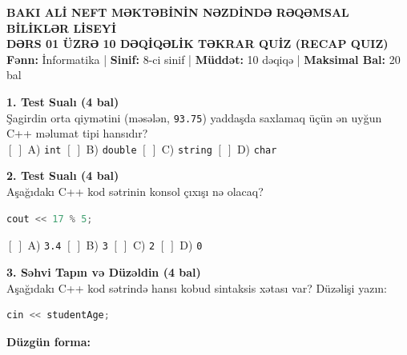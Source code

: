 \documentclass[10pt,a4paper]{article}
\begin{document}
\begin{center}
    {\large \textbf{BAKI ALİ NEFT MƏKTƏBİNİN NƏZDİNDƏ RƏQƏMSAL BİLİKLƏR LİSEYİ}}\\[0.1cm]
    {\Large \textbf{DƏRS 01 ÜZRƏ 10 DƏQİQƏLİK TƏKRAR QUİZ (RECAP QUIZ)}}\\[0.1cm]
    {\small \textbf{Fənn:} İnformatika \quad | \quad \textbf{Sinif:} 8-ci sinif \quad | \quad \textbf{Müddət:} 10 dəqiqə \quad | \quad \textbf{Maksimal Bal:} 20 bal}
\end{center}

\vspace{0.05cm}
\noindent{}

\vspace{0.25cm}

\textbf{1. Test Sualı (4 bal)}\\
Şagirdin orta qiymətini (məsələn, \texttt{93.75}) yaddaşda saxlamaq üçün ən uyğun C++ məlumat tipi hansıdır?\\
$[ \ ]$ A) \texttt{int} \hspace{2cm} $[ \ ]$ B) \texttt{double} \hspace{2cm} $[ \ ]$ C) \texttt{string} \hspace{2cm} $[ \ ]$ D) \texttt{char}

\vspace{0.35cm}
\textbf{2. Test Sualı (4 bal)}\\
Aşağıdakı C++ kod sətrinin konsol çıxışı nə olacaq?
\begin{lstlisting}[language=C++]
cout << 17 % 5;
\end{lstlisting}
$[ \ ]$ A) \texttt{3.4} \hspace{2cm} $[ \ ]$ B) \texttt{3} \hspace{2cm} $[ \ ]$ C) \texttt{2} \hspace{2cm} $[ \ ]$ D) \texttt{0}

\vspace{0.35cm}
\textbf{3. Səhvi Tapın və Düzəldin (4 bal)}\\
Aşağıdakı C++ kod sətrində hansı kobud sintaksis xətası var? Düzəlişi yazın:
\begin{lstlisting}[language=C++]
cin << studentAge;
\end{lstlisting}
\textbf{Düzgün forma:} \hrulefill
\end{document}
